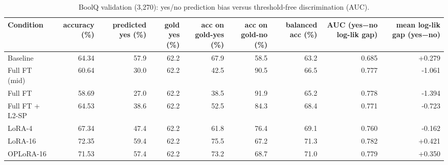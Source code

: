 \begin{table}[t]
\centering\small
\begin{tabular}{lrrrrrrrr}
\toprule
Condition & accuracy (\%) & predicted yes (\%) & gold yes (\%) & acc on gold-yes (\%) & acc on gold-no (\%) & balanced acc (\%) & AUC (yes−no log-lik gap) & mean log-lik gap (yes−no) \\
\midrule
Baseline & 64.34 & 57.9 & 62.2 & 67.9 & 58.5 & 63.2 & 0.685 & +0.279 \\
Full FT (mid) & 60.64 & 30.0 & 62.2 & 42.5 & 90.5 & 66.5 & 0.777 & -1.061 \\
Full FT & 58.69 & 27.0 & 62.2 & 38.5 & 91.9 & 65.2 & 0.778 & -1.394 \\
Full FT + L2-SP & 64.53 & 38.6 & 62.2 & 52.5 & 84.3 & 68.4 & 0.771 & -0.723 \\
LoRA-4 & 67.34 & 47.4 & 62.2 & 61.8 & 76.4 & 69.1 & 0.760 & -0.162 \\
LoRA-16 & 72.35 & 59.4 & 62.2 & 75.5 & 67.2 & 71.3 & 0.782 & +0.421 \\
OPLoRA-16 & 71.53 & 57.4 & 62.2 & 73.2 & 68.7 & 71.0 & 0.779 & +0.350 \\
\bottomrule
\end{tabular}
\caption{BoolQ validation (3,270): yes/no prediction bias versus threshold-free discrimination (AUC).}
\label{tab:task1_boolq_bias}
\end{table}
